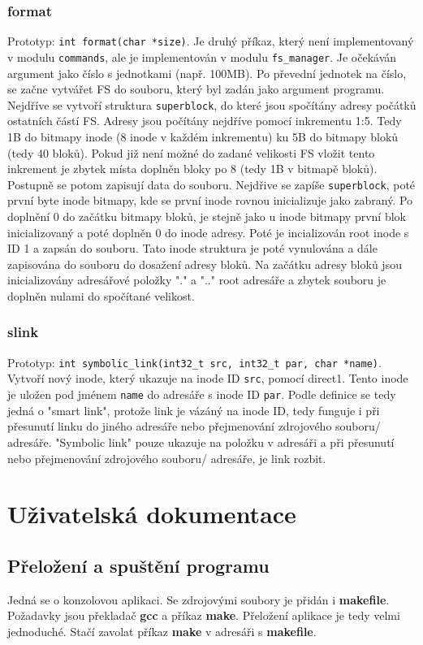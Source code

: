 \documentclass[12pt]{report}
\begin{document}
\subsection{format}
Prototyp: \texttt{int format(char *size)}. Je druhý příkaz, který není implementovaný v modulu \texttt{commands},
ale je implementován v modulu \texttt{fs\_manager}. Je očekáván argument jako číslo s jednotkami (např. 100MB). 
Po převední jednotek na číslo, se začne vytvářet FS do souboru, který byl zadán jako argument programu. Nejdříve
se vytvoří struktura \texttt{superblock}, do které jsou spočítány adresy počátků ostatních částí FS. Adresy jsou
počítány nejdříve pomocí inkrementu 1:5. Tedy 1B do bitmapy inode (8 inode v každém inkrementu) ku 5B do bitmapy
bloků (tedy 40 bloků). Pokud již není možné do zadané velikosti FS vložit tento inkrement je zbytek místa doplněn bloky
po 8 (tedy 1B v bitmapě bloků). Postupně se potom zapisují data do souboru. Nejdřive se zapíše \texttt{superblock},
poté první byte inode bitmapy, kde se první inode rovnou inicializuje jako zabraný. Po doplnění 0 do začátku bitmapy
bloků, je stejně jako u inode bitmapy první blok inicializovaný a poté doplněn 0 do inode adresy. Poté je incializován
root inode s ID 1 a zapsán do souboru. Tato inode struktura je poté vynulována a dále zapisována do souboru do dosažení
adresy bloků. Na začátku adresy bloků jsou inicializovány adresářové položky "." a ".." root adresáře a zbytek souboru
je doplněn nulami do spočítané velikost.
\subsection{slink}
Prototyp: \texttt{int symbolic\_link(int32\_t src, int32\_t par, char *name)}. Vytvoří nový inode, který ukazuje
na inode ID \texttt{src}, pomocí direct1. Tento inode je uložen pod jménem \texttt{name} do adresáře s inode ID
\texttt{par}. Podle definice se tedy jedná o "smart link", protože link je vázáný na inode ID, tedy funguje
i při přesunutí linku do jiného adresáře nebo přejmenování zdrojového souboru/ adresáře. "Symbolic link" pouze
ukazuje na položku v adresáři a při přesunutí nebo přejmenování zdrojového souboru/ adresáře, je link rozbit.
%
%
\chapter{Uživatelská dokumentace}
%
\section{Přeložení a spuštění programu}
Jedná se o konzolovou aplikaci. Se zdrojovými soubory je přidán i \textbf{makefile}. Požadavky jsou
překladač \textbf{gcc} a příkaz \textbf{make}. Přeložení aplikace je tedy velmi jednoduché. Stačí 
zavolat příkaz \textbf{make} v adresáři s \textbf{makefile}.
\end{document}
